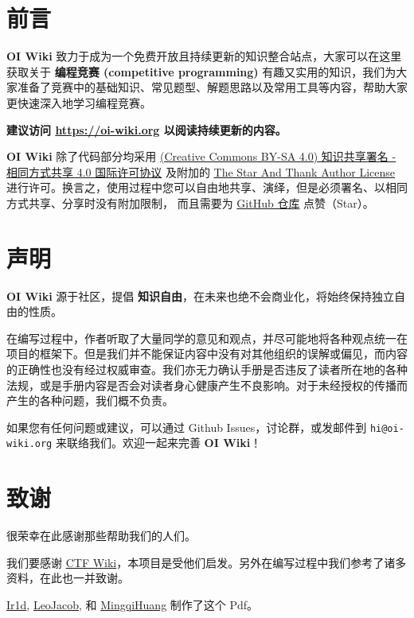 \section*{\centering 前言}

\textbf{OI Wiki} 致力于成为一个免费开放且持续更新的知识整合站点，大家可以在这里获取关于 \textbf{编程竞赛 (competitive programming)} 有趣又实用的知识，我们为大家准备了竞赛中的基础知识、常见题型、解题思路以及常用工具等内容，帮助大家更快速深入地学习编程竞赛。

\textbf{建议访问 \href{https://oi-wiki.org}{https://oi-wiki.org} 以阅读持续更新的内容。}

\textbf{OI Wiki} 除了代码部分均采用 \href{https://creativecommons.org/licenses/by-sa/4.0/deed.zh}{(Creative Commons BY-SA 4.0) 知识共享署名 - 相同方式共享 4.0 国际许可协议} 及附加的 \href{https://github.com/zTrix/sata-license}{The Star And Thank Author License} 进行许可。换言之，使用过程中您可以自由地共享、演绎，但是必须署名、以相同方式共享、分享时没有附加限制，
而且需要为 \href{https://github.com/24OI/OI-wiki}{GitHub 仓库} 点赞（Star）。


\section*{\centering 声明}

\textbf{OI Wiki} 源于社区，提倡 \textbf{知识自由}，在未来也绝不会商业化，将始终保持独立自由的性质。

在编写过程中，作者听取了大量同学的意见和观点，并尽可能地将各种观点统一在项目的框架下。但是我们并不能保证内容中没有对其他组织的误解或偏见，而内容的正确性也没有经过权威审查。我们亦无力确认手册是否违反了读者所在地的各种法规，或是手册内容是否会对读者身心健康产生不良影响。对于未经授权的传播而产生的各种问题，我们概不负责。

如果您有任何问题或建议，可以通过 Github Issues，讨论群，或发邮件到 \texttt{hi@oi-wiki.org} 来联络我们。欢迎一起来完善 \textbf{OI Wiki}！


\clearpage
\section*{\centering 致谢}
很荣幸在此感谢那些帮助我们的人们。

我们要感谢 \href{https://ctf-wiki.github.io/ctf-wiki/}{CTF Wiki}，本项目是受他们启发。另外在编写过程中我们参考了诸多资料，在此也一并致谢。

\href{https://github.com/Ir1d}{Ir1d}, \href{https://github.com/LeoJacob}{LeoJacob}, 和 \href{https://github.com/MingqiHuang}{MingqiHuang} 制作了这个 Pdf。

